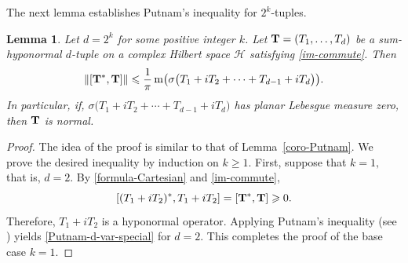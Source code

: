 \documentclass[10pt, a4paper, oneside, reqno]{amsproc}
\numberwithin{equation}{section}
\newtheorem{lemma}[theorem]{Lemma}
\theoremstyle{remark}
\theoremstyle{definition}
\newcommand*{\Ge}{\geqslant}
\newcommand*{\Le}{\leqslant}
\begin{document}
The next lemma establishes Putnam's inequality for $2^k$-tuples. 
\begin{lemma} \label{Putnam-prop}
Let $d=2^k$ for some positive integer $k$.
Let ${\bf T}=(T_1, \ldots, T_d)$ be a sum-hyponormal $d$-tuple on a complex Hilbert space $\mathcal H$ satisfying \eqref{im-commute}. Then
\begin{equation}
\label{Putnam-d-var-special}
\|[{\bf T}^*, {\bf T}]\| \Le \frac{1}{\pi}\, \mathrm{m}\big(\sigma\big(T_{1}+iT_{2}+ \cdots + T_{d-1}+iT_{d}\big)\big).
\end{equation}
In particular, if, $\sigma\big(T_{1}+iT_{2}+ \cdots + T_{d-1}+iT_{d}\big)$ has planar Lebesgue measure zero, then ${\bf T}$ is normal.
\end{lemma}
\begin{proof} 
The idea of the proof is similar to that of Lemma~\ref{coro-Putnam}. We prove the desired inequality by induction on $k \Ge 1.$ First, suppose that $k=1,$ that is, $d=2$.
By \eqref{formula-Cartesian} and \eqref{im-commute}, 
\begin{equation}
\label{Berger-Shaw-application}
[(T_1+iT_2)^*, T_1+iT_2] = [{\bf T}^*, {\bf T}] \Ge 0.
\end{equation}
Therefore, $T_1+iT_2$ is a hyponormal operator. Applying Putnam's inequality (see \cite[Theorem~VI.2.1]{MP1989}) yields \eqref{Putnam-d-var-special} for $d=2$. This completes the proof of the base case $k=1$.


\end{proof}
\end{document}
